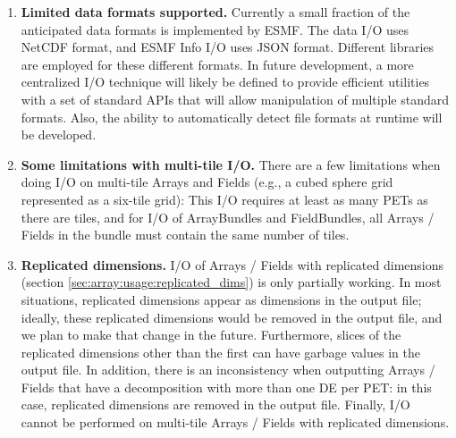 
\begin{enumerate}

\item {\bf Limited data formats supported.}
Currently a small fraction of the anticipated data formats is implemented by 
ESMF.  The data I/O uses NetCDF format, and ESMF Info
I/O uses JSON format.  Different libraries are employed for these
different formats.  In future development, a more centralized I/O technique
will likely be defined to provide efficient utilities with a set of standard
APIs that will allow manipulation of multiple standard formats.  Also, the 
ability to automatically detect file formats at runtime will be developed.

\item {\bf Some limitations with multi-tile I/O.}
There are a few limitations when doing I/O on multi-tile Arrays and
Fields (e.g., a cubed sphere grid represented as a six-tile grid): This
I/O requires at least as many PETs as there are tiles, and for I/O of
ArrayBundles and FieldBundles, all Arrays / Fields in the bundle must
contain the same number of tiles.

\item {\bf Replicated dimensions.}
I/O of Arrays / Fields with replicated dimensions (section
\ref{sec:array:usage:replicated_dims}) is only partially working. In
most situations, replicated dimensions appear as dimensions in the
output file; ideally, these replicated dimensions would be removed in
the output file, and we plan to make that change in the future.
Furthermore, slices of the replicated dimensions other than the first
can have garbage values in the output file. In addition, there is an
inconsistency when outputting Arrays / Fields that have a decomposition
with more than one DE per PET: in this case, replicated dimensions are
removed in the output file. Finally, I/O cannot be performed on
multi-tile Arrays / Fields with replicated dimensions.

\end{enumerate}
